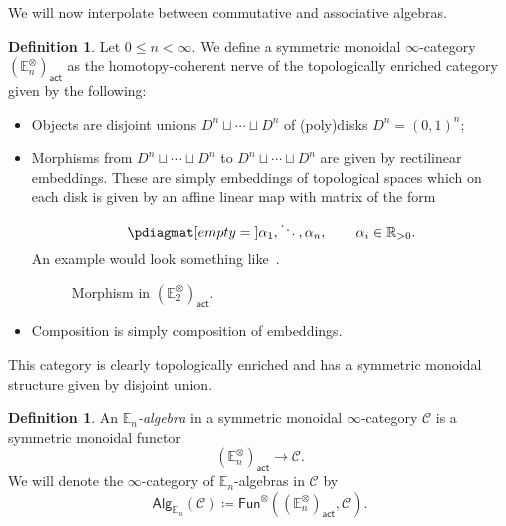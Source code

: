 \documentclass[10pt]{amsart}
\theoremstyle{definition}
\newtheorem{defn}[thm]{Definition}
\theoremstyle{remark}
\theoremstyle{plain}
\theoremstyle{definition}
\theoremstyle{remark}
\newcommand{\R}{\mathbb{R}}
\newcommand{\E}{\mathbb{E}}
\newcommand{\mc}[1]{\mathcal{#1}}
\newcommand{\ms}[1]{\mathsf{#1}}
\newcommand{\1}{\mathbf{1}}
\newcommand{\2}{\mathbf{2}}
\newcommand{\3}{\mathbf{3}}
\begin{document}
We will now interpolate between commutative and associative algebras.
\begin{defn}
    Let $0 \leq n < \infty$. We define a symmetric monoidal $\infty$-category $(\E_n^{\otimes})_{\ms{act}}$ as the homotopy-coherent nerve of the topologically enriched category given by the following:
    \begin{itemize}
        \item Objects are disjoint unions $D^n \sqcup \cdots \sqcup D^n$ of (poly)disks $D^n = (0,1)^n$;
        \item Morphisms from $D^n \sqcup \cdots \sqcup D^n$ to $D^n \sqcup \cdots \sqcup D^n$ are given by rectilinear embeddings. These are simply embeddings of topological spaces which on each disk is given by an affine linear map with matrix of the form
        \[ \pdiagmat[empty={}]{\alpha_1,\ddots,\alpha_n}, \qquad \alpha_i \in \R_{>0}. \]
        An example would look something like~.
        \begin{figure}[htpb]
        \begin{center}
        \end{center}
        \caption{Morphism in $(\E_2^{\otimes})_{\ms{act}}$.}%
        \label{fig:E2operad}
        \end{figure}
        \item Composition is simply composition of embeddings.
    \end{itemize}
    This category is clearly topologically enriched and has a symmetric monoidal structure given by disjoint union.
\end{defn}

\begin{defn}
    An \textit{$\E_n$-algebra} in a symmetric monoidal $\infty$-category $\mc{C}$ is a symmetric monoidal functor
    \[ (\E_n^{\otimes})_{\ms{act}} \to \mc{C}. \]
    We will denote the $\infty$-category of $\E_n$-algebras in $\mc{C}$ by
    \[ \ms{Alg}_{\E_n}(\mc{C}) \coloneqq \ms{Fun}^{\otimes} ((\E_n^{\otimes})_{\ms{act}}, \mc{C}). \]
\end{defn}
\end{document}
